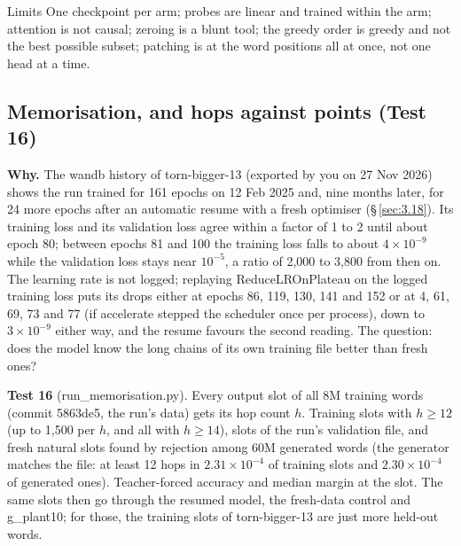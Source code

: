 \documentclass[paper=a4,fontsize=11pt,DIV=11,parskip=half,headings=small,numbers=noendperiod]{scrartcl}
\DeclareRobustCommand{\lead}[1]{\textsf{\bfseries\color{accent}#1}}
\DeclareRobustCommand{\code}[1]{{\fontseries{m}\ttfamily #1}}
\begin{document}
\begin{limbox}{Limits}
One checkpoint per arm; probes are linear and trained within the arm; attention is not causal; zeroing is a
blunt tool; the greedy order is greedy and not the best possible subset; patching is at the word positions all
at once, not one head at a time.
\end{limbox}

\subsection{Memorisation, and hops against points (Test 16)}\label{sec:3.17}
\lead{Why.} The wandb history of \code{torn-\allowbreak{}bigger-\allowbreak{}13} (exported by you on 27 Nov
2026) shows the run trained for 161 epochs on 12 Feb 2025 and, nine months later, for 24 more epochs after an
automatic resume with a fresh optimiser (\S\,\ref{sec:3.18}). Its training loss and its validation loss agree
within a factor of 1 to 2 until about epoch 80; between epochs 81 and 100 the training loss falls to about
$4\times10^{-9}$ while the validation loss stays near $10^{-5}$, a ratio of 2,000 to 3,800 from then on. The
learning rate is not logged; replaying \code{ReduceLROnPlateau} on the logged training loss puts its drops
either at epochs 86, 119, 130, 141 and 152 or at 4, 61, 69, 73 and 77 (if accelerate stepped the scheduler once
per process), down to $3\times10^{-9}$ either way, and the resume favours the second reading. The question: does
the model know the long chains of its own training file better than fresh ones?

\lead{Test 16} (\code{run\_\allowbreak{}memorisation.\allowbreak{}py}). Every output slot of all 8M training
words (commit \code{5863de5}, the run’s data) gets its hop count $h$. Training slots with $h\ge12$ (up to 1,500
per $h$, and all with $h\ge14$), slots of the run’s validation file, and fresh natural slots found by rejection
among 60M generated words (the generator matches the file: at least 12 hops in $2.31\times10^{-4}$ of training
slots and $2.30\times10^{-4}$ of generated ones). Teacher-forced accuracy and median margin at the slot. The
same slots then go through the resumed model, the fresh-data control and \code{g\_\allowbreak{}plant10}; for
those, the training slots of \code{torn-\allowbreak{}bigger-\allowbreak{}13} are just more held-out words.
\end{document}
